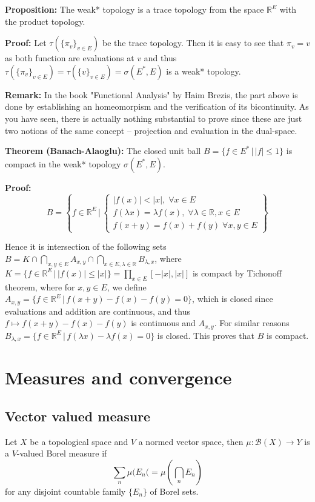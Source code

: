 \documentclass{article}
\begin{document}
\vspace{1ex}
\textbf{Proposition:} The weak* topology is a trace topology from the space
$\mathbb{R}^E$ with the product topology.

\vspace{1ex}
\textbf{Proof:} Let $\tau(\{\pi_v\}_{v\in E})$ be the trace topology. Then it
is easy to see that $\pi_v=v$ as both function are evaluations at $v$ and thus
$\tau(\{\pi_v\}_{v\in E})=\tau(\{v\}_{v\in E})=\sigma(E^*, E)$ is a weak*
topology.

\vspace{1ex}
\textbf{Remark:} In the book "Functional Analysis" by Haim Brezis, the part
above is done by establishing an homeomorpism and the verification of its bicontinuity.
As you have seen, there is actually nothing substantial to prove since these are 
just two notions of the same concept – projection and evaluation in the dual-space.

\vspace{1ex}
\textbf{Theorem (Banach-Alaoglu):} The closed unit ball $B=\{f\in E^*\,|\,|
f|\leq 1\}$ is compact in the weak* topology $\sigma(E^*, E)$.

\vspace{1ex}
\textbf{Proof:}
\[ B=\left\{f\in\mathbb{R}^E\,|\,
\begin{cases}
    |f(x)|<|x|,\;\forall x\in E\\
    f(\lambda x)=\lambda f(x),\;\forall\lambda\in\mathbb{R}, x\in E\\
    f(x+y)=f(x)+f(y)\;\forall x,y\in E
\end{cases}
\right\} \] 

Hence it is intersection of the following sets $B=K\cap\bigcap_{x,y\in E} A_{x,y}
\cap\bigcap_{x\in E, \lambda\in\mathbb{R}}B_{\lambda,x}$, where $K=\{f\in\mathbb
{R}^E\,|\,|f(x)|\leq|x|\}=\prod_{x\in E}[-|x|, |x|]$ is compact by Tichonoff
theorem, where for $x,y\in E$, we define $A_{x,y}=\{f\in\mathbb{R}^E\,|\,f(x+y)-
f(x)-f(y)=0\}$, which is closed since evaluations and addition are continuous, and
thus $f\mapsto f(x+y)-f(x)-f(y)$ is continuous and $A_{x,y}$. For similar
reasons $B_{\lambda, x}=\{f\in\mathbb{R}^E\,|\,f(\lambda x)-\lambda f(x)=0\}$ is
closed. This proves that $B$ is compact.


\section{Measures and convergence}

\subsection{Vector valued measure}
Let $X$ be a topological space and $V$ a normed vector space, then $\mu:\mathcal{B}(X)
\rightarrow Y$ is a $V$-valued Borel measure if
\[\sum_n\mu(E_n(=\mu(\bigcap_n E_n)\]
for any disjoint countable family $\{E_n\}$ of Borel sets.
\end{document}
